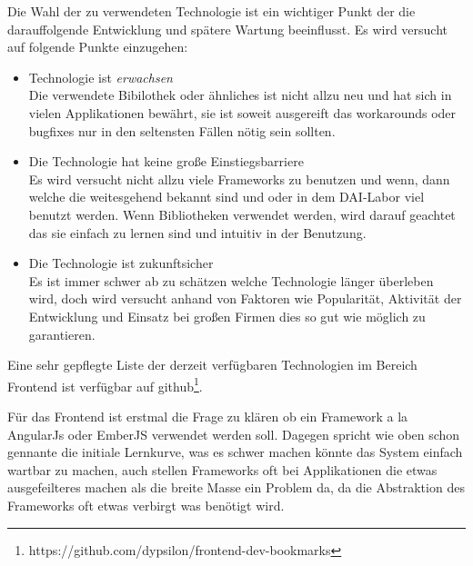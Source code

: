 \documentclass[12pt,twoside]{book}
\begin{document}
Die Wahl der zu verwendeten Technologie ist ein wichtiger Punkt der die darauffolgende Entwicklung und spätere Wartung beeinflusst. Es wird versucht auf folgende Punkte einzugehen:

\begin{itemize}
  \item Technologie ist \textit{erwachsen} \\
  Die verwendete Bibilothek oder ähnliches ist nicht allzu neu und hat sich in vielen Applikationen bewährt, sie ist soweit ausgereift das workarounds oder bugfixes nur in den seltensten Fällen nötig sein sollten.
  \item Die Technologie hat keine große Einstiegsbarriere \\
  Es wird versucht nicht allzu viele Frameworks zu benutzen und wenn, dann welche die weitesgehend bekannt sind und oder in dem DAI-Labor viel benutzt werden. Wenn Bibliotheken verwendet werden, wird darauf geachtet das sie einfach zu lernen sind und intuitiv in der Benutzung.
  \item Die Technologie ist zukunftsicher \\
  Es ist immer schwer ab zu schätzen welche Technologie länger überleben wird, doch wird versucht anhand von Faktoren wie Popularität, Aktivität der Entwicklung und Einsatz bei großen Firmen dies so gut wie möglich zu garantieren.
\end{itemize}


Eine sehr gepflegte Liste der derzeit verfügbaren Technologien im Bereich Frontend ist verfügbar auf github\footnote{https://github.com/dypsilon/frontend-dev-bookmarks}.

Für das Frontend ist erstmal die Frage zu klären ob ein Framework a la AngularJs oder EmberJS verwendet werden soll. Dagegen spricht wie oben schon gennante die initiale Lernkurve, was es schwer machen könnte das System einfach wartbar zu machen, auch stellen Frameworks oft bei Applikationen die etwas ausgefeilteres machen als die breite Masse ein Problem da, da die Abstraktion des Frameworks oft etwas verbirgt was benötigt wird.
\end{document}
